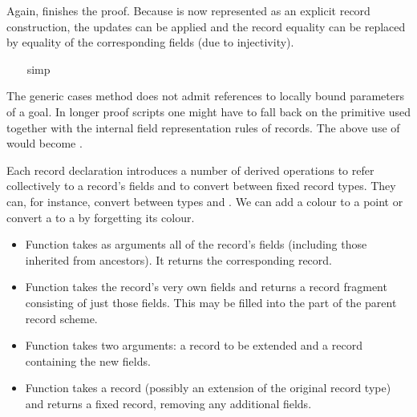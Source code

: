 \begin{isabellebody}
\begin{isamarkuptxt}
\begin{isabelle}
\end{isabelle} Again,  finishes the proof.  Because  is now represented as
  an explicit record construction, the updates can be applied and the
  record equality can be replaced by equality of the corresponding
  fields (due to injectivity).%
\end{isamarkuptxt}%
\ \ \isamarkuptrue%
\ simp\isanewline
\ \ \isamarkupfalse%
\isamarkupfalse%
%
\begin{isamarkuptext}%
The generic cases method does not admit references to locally bound
  parameters of a goal.  In longer proof scripts one might have to
  fall back on the primitive  used together with the
  internal field representation rules of records.  The above use of
   would become .%
\end{isamarkuptext}%
\isamarkuptrue%
%
\isamarkuptrue%
%
\begin{isamarkuptext}%
Each record declaration introduces a number of derived operations to
  refer collectively to a record's fields and to convert between fixed
  record types.  They can, for instance, convert between types  and .  We can add a colour to a point or convert
  a  to a  by forgetting its colour.

  \begin{itemize}

  \item Function  takes as arguments all of the record's
  fields (including those inherited from ancestors).  It returns the
  corresponding record.

  \item Function  takes the record's very own fields and
  returns a record fragment consisting of just those fields.  This may
  be filled into the  part of the parent record scheme.

  \item Function  takes two arguments: a record to be
  extended and a record containing the new fields.

  \item Function  takes a record (possibly an extension
  of the original record type) and returns a fixed record, removing
  any additional fields.


\end{itemize}
\end{isamarkuptext}
\end{isabellebody}
